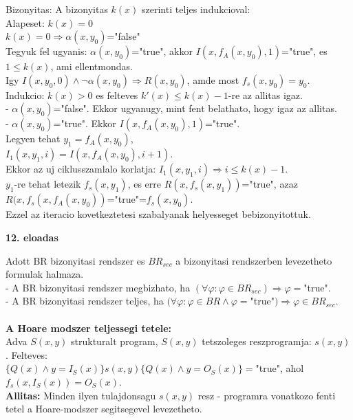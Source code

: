 \documentclass[a4paper,10pt]{article}
\begin{document}
Bizonyitas: A bizonyitas $k(x)$ szerinti teljes indukcioval:\\
Alapeset: $k(x)=0$\\
$k(x)= 0 \Rightarrow \alpha(x,y_0)$="false"\\
Tegyuk fel ugyanis: $\alpha(x,y_0)$="true", akkor $I(x, f_A(x, y_0), 1)$="true", es $1\le k(x)$, ami ellentmondas.\\
Igy $I(x,y_0, 0) \wedge\neg\alpha(x,y_0) \Rightarrow R(x,y_0)$, amde most $f_s(x,y_0)=y_0$.\\
Indukcio: $k(x)>0$ es felteves $k'(x)\le k(x)-1$-re az allitas igaz.\\
\indent - $\alpha(x,y_0)$="false". Ekkor ugyanugy, mint fent belathato, hogy igaz az allitas.\\
\indent - $\alpha(x,y_0)$="true". Ekkor $I(x, f_A(x, y_0), 1)$="true".\\
Legyen tehat
\indent $y_1 = f_A(x,y_0)$,\\
\indent $I_1(x,y_1,i)=I(x,f_A(x,y_0), i+1)$.\\
Ekkor az uj ciklusszamlalo korlatja: $I_1(x,y_1,i) \Rightarrow i\le k(x)-1$.\\
$y_1$-re tehat letezik $f_s(x,y_1)$, es erre $R(x, f_s(x,y_1))$="true", azaz\\
$R(x, f_s(x, f_A(x,y_0))$="true"=$f_s(x,y_0)$.\\
Ezzel az iteracio kovetkeztetesi szabalyanak helyesseget bebizonyitottuk.
\newpage
%
%
\begin{flushleft}
\textbf{12. eloadas}
\end{flushleft}
Adott BR bizonyitasi rendszer es $BR_{sec}$ a bizonyitasi rendszerben levezetheto formulak halmaza.\\
- A BR bizonyitasi rendszer megbizhato, ha $(\forall \varphi: \varphi\in BR_{sec}) \Rightarrow \varphi =$"true".\\
- A BR bizonyitasi rendszer teljes, ha $(\forall\varphi: \varphi\in BR \wedge \varphi=$"true"$) \Rightarrow \varphi \in BR_{sec}$.\\
\\
\textbf{A Hoare modszer teljessegi tetele:}\\
Adva $S(x,y)$ strukturalt program, $S(x,y)$ tetszoleges reszprogramja: $s(x,y)$.
Felteves:\\
$\lbrace Q(x) \wedge y=I_S(x)\rbrace s(x,y) \lbrace Q(x) \wedge y=O_S(x)\rbrace=$"true", ahol $f_s(x, I_S(x))=O_S(x)$.\\
\textbf{Allitas:} Minden ilyen tulajdonsagu $s(x,y)$ resz - programra vonatkozo fenti tetel a Hoare-modszer segitsegevel levezetheto.\\
\end{document}
